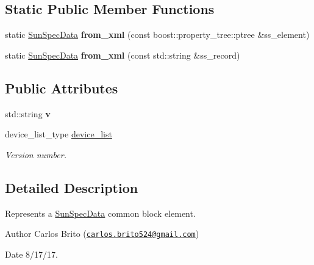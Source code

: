 \subsection*{Static Public Member Functions}
\begin{DoxyCompactItemize}
\item 
\mbox{\label{structsunspec_1_1data_1_1_sun_spec_data_ab75fc9474cfbbeed845edc896b96501e}} 
static \hyperlink{structsunspec_1_1data_1_1_sun_spec_data}{Sun\+Spec\+Data} {\bfseries from\+\_\+xml} (const boost\+::property\+\_\+tree\+::ptree \&ss\+\_\+element)
\item 
\mbox{\label{structsunspec_1_1data_1_1_sun_spec_data_a2bf6cdff301a72cae169d9077e86e92a}} 
static \hyperlink{structsunspec_1_1data_1_1_sun_spec_data}{Sun\+Spec\+Data} {\bfseries from\+\_\+xml} (const std\+::string \&ss\+\_\+record)
\end{DoxyCompactItemize}
\subsection*{Public Attributes}
\begin{DoxyCompactItemize}
\item 
\mbox{\label{structsunspec_1_1data_1_1_sun_spec_data_aeb1d272c4563689a07b64fa2a41f0465}} 
std\+::string {\bfseries v}
\item 
\mbox{\label{structsunspec_1_1data_1_1_sun_spec_data_ad4bcf24695b7777dc530120320dc44ec}} 
device\+\_\+list\+\_\+type \hyperlink{structsunspec_1_1data_1_1_sun_spec_data_ad4bcf24695b7777dc530120320dc44ec}{device\+\_\+list}
\begin{DoxyCompactList}\small\item\em Version number. \end{DoxyCompactList}\end{DoxyCompactItemize}


\subsection{Detailed Description}
Represents a \hyperlink{structsunspec_1_1data_1_1_sun_spec_data}{Sun\+Spec\+Data} common block element. 

\begin{DoxyAuthor}{Author}
Carlos Brito (\href{mailto:carlos.brito524@gmail.com}{\tt carlos.\+brito524@gmail.\+com}) 
\end{DoxyAuthor}
\begin{DoxyDate}{Date}
8/17/17.
\end{DoxyDate}
